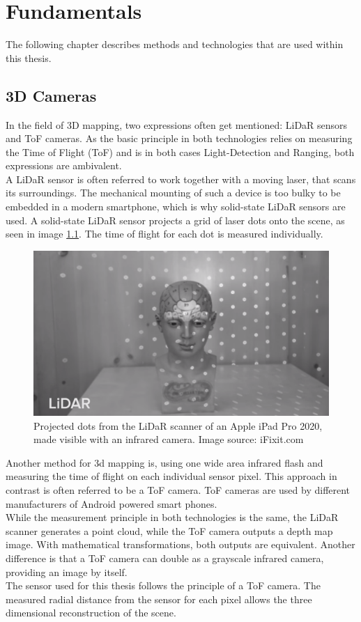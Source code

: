\chapter{Fundamentals}
\label{sec:Fundamentals}
The following chapter describes methods and technologies that are used within this thesis.
\section{3D Cameras}
\label{sec:ToFCamera}
In the field of 3D mapping, two expressions often get mentioned: LiDaR sensors and ToF cameras. As the basic principle in both technologies relies on measuring the Time of Flight (ToF) and is in both cases Light-Detection and Ranging, both expressions are ambivalent.\\
A LiDaR sensor is often referred to work together with a moving laser, that scans its surroundings.\cite{Techradar_Lidar} The mechanical mounting of such a device is too bulky to be embedded in a modern smartphone, which is why solid-state LiDaR sensors are used. A solid-state LiDaR sensor projects a grid of laser dots onto the scene, as seen in image \ref{im:iPadLidar}. The time of flight for each dot is measured individually.
\begin{figure}[H]
    \centering
    \includegraphics[width=1.0\textwidth]{images/ifixit_lidar.png}
    \caption{Projected dots from the LiDaR scanner of an Apple iPad Pro 2020, made visible with an infrared camera. Image source: iFixit.com}
    \label{im:iPadLidar}
\end{figure}
Another method for 3d mapping is, using one wide area infrared flash and measuring the time of flight on each individual sensor pixel. This approach in contrast is often referred to be a ToF camera. ToF cameras are used by different manufacturers of Android powered smart phones.\\
While the measurement principle in both technologies is the same, the LiDaR scanner generates a point cloud, while the ToF camera outputs a depth map image. With mathematical transformations, both outputs are equivalent. Another difference is that a ToF camera can double as a grayscale infrared camera, providing an image by itself. \\
The sensor used for this thesis follows the principle of a ToF camera. The measured radial distance from the sensor for each pixel allows the three dimensional reconstruction of the scene. 

